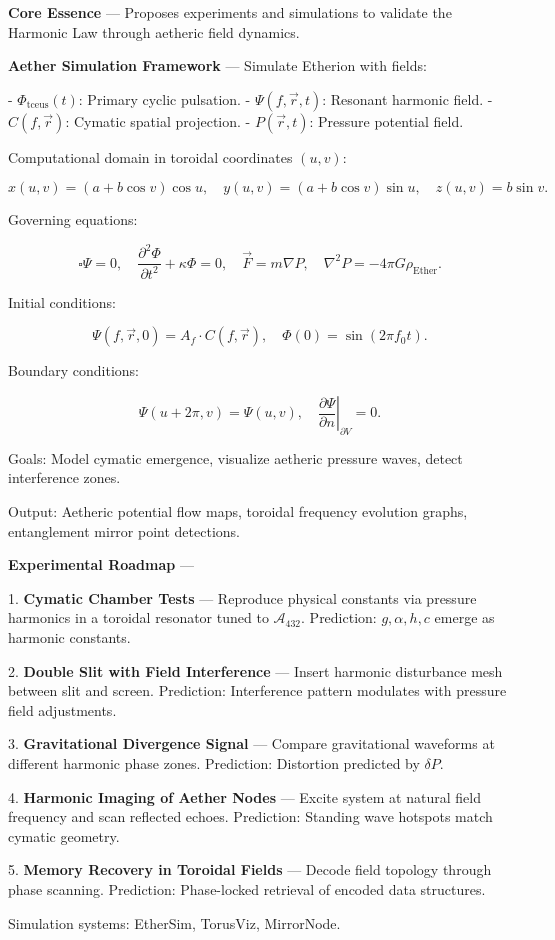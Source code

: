 
\textbf{Core Essence} --- Proposes experiments and simulations to validate the Harmonic Law through aetheric field dynamics.

\textbf{Aether Simulation Framework} --- Simulate Etherion with fields:

- $\Phi_{\text{tceus}}(t)$: Primary cyclic pulsation.
- $\Psi(f, \vec{r}, t)$: Resonant harmonic field.
- $C(f, \vec{r})$: Cymatic spatial projection.
- $P(\vec{r}, t)$: Pressure potential field.

Computational domain in toroidal coordinates $(u, v)$:

$$
x(u, v) = (a + b \cos v) \cos u, \quad y(u, v) = (a + b \cos v) \sin u, \quad z(u, v) = b \sin v.
$$

Governing equations:

$$
\square \Psi = 0, \quad \frac{\partial^2 \Phi}{\partial t^2} + \kappa \Phi = 0, \quad \vec{F} = m \nabla P, \quad \nabla^2 P = -4 \pi G \rho_{\text{Ether}}.
$$

Initial conditions:

$$
\Psi(f, \vec{r}, 0) = A_f \cdot C(f, \vec{r}), \quad \Phi(0) = \sin (2 \pi f_0 t).
$$

Boundary conditions:

$$
\Psi(u + 2\pi, v) = \Psi(u, v), \quad \left. \frac{\partial \Psi}{\partial n} \right|_{\partial V} = 0.
$$

Goals: Model cymatic emergence, visualize aetheric pressure waves, detect interference zones.

Output: Aetheric potential flow maps, toroidal frequency evolution graphs, entanglement mirror point detections.

\textbf{Experimental Roadmap} ---

1. \textbf{Cymatic Chamber Tests} --- Reproduce physical constants via pressure harmonics in a toroidal resonator tuned to $\mathcal{A}_{432}$. Prediction: $g, \alpha, h, c$ emerge as harmonic constants.

2. \textbf{Double Slit with Field Interference} --- Insert harmonic disturbance mesh between slit and screen. Prediction: Interference pattern modulates with pressure field adjustments.

3. \textbf{Gravitational Divergence Signal} --- Compare gravitational waveforms at different harmonic phase zones. Prediction: Distortion predicted by $\delta P$.

4. \textbf{Harmonic Imaging of Aether Nodes} --- Excite system at natural field frequency and scan reflected echoes. Prediction: Standing wave hotspots match cymatic geometry.

5. \textbf{Memory Recovery in Toroidal Fields} --- Decode field topology through phase scanning. Prediction: Phase-locked retrieval of encoded data structures.

Simulation systems: EtherSim, TorusViz, MirrorNode.

